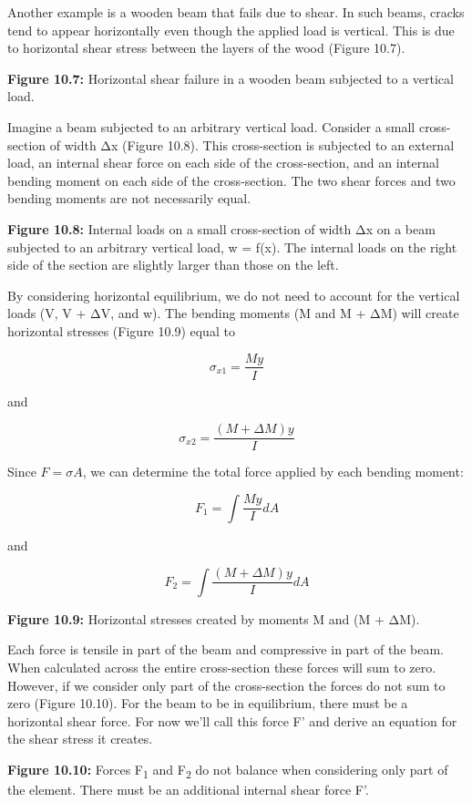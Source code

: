 \documentclass[
  letterpaper,
  DIV=11,
  numbers=noendperiod]{scrreprt}
\begin{document}
Another example is a wooden beam that fails due to shear. In such beams,
cracks tend to appear horizontally even though the applied load is
vertical. This is due to horizontal shear stress between the layers of
the wood (Figure 10.7).

\textbf{Figure 10.7:} Horizontal shear failure in a wooden beam
subjected to a vertical load.

Imagine a beam subjected to an arbitrary vertical load. Consider a small
cross-section of width Δx (Figure 10.8). This cross-section is subjected
to an external load, an internal shear force on each side of the
cross-section, and an internal bending moment on each side of the
cross-section. The two shear forces and two bending moments are not
necessarily equal.

\textbf{Figure 10.8:} Internal loads on a small cross-section of width
Δx on a beam subjected to an arbitrary vertical load, w = f(x). The
internal loads on the right side of the section are slightly larger than
those on the left.

By considering horizontal equilibrium, we do not need to account for the
vertical loads (V, V + ΔV, and w). The bending moments (M and M + ΔM)
will create horizontal stresses (Figure 10.9) equal to

\[
\sigma_{x 1}=\frac{M y}{I}
\]

and

\[
\sigma_{x 2}=\frac{(M+\Delta M) y}{I}
\]

Since \(F=\sigma A\), we can determine the total force applied by each
bending moment:

\[
F_1=\int \frac{M y}{I} d A
\]

and

\[
F_2=\int \frac{(M+\Delta M) y}{I} d A
\]

\textbf{Figure 10.9:} Horizontal stresses created by moments M and (M +
ΔM).

Each force is tensile in part of the beam and compressive in part of the
beam. When calculated across the entire cross-section these forces will
sum to zero. However, if we consider only part of the cross-section the
forces do not sum to zero (Figure 10.10). For the beam to be in
equilibrium, there must be a horizontal shear force. For now we'll call
this force F' and derive an equation for the shear stress it creates.

\textbf{Figure 10.10:} Forces F\textsubscript{1} and F\textsubscript{2}
do not balance when considering only part of the element. There must be
an additional internal shear force F'.
\end{document}

